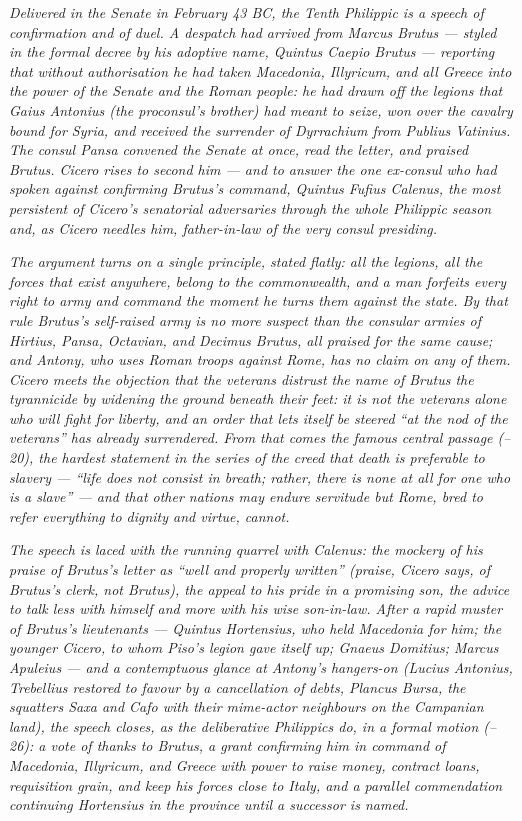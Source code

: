
\textit{Delivered in the Senate in February 43 BC, the Tenth
Philippic is a speech of confirmation and of duel. A despatch had
arrived from Marcus Brutus --- styled in the formal decree by his
adoptive name, Quintus Caepio Brutus --- reporting that without
authorisation he had taken Macedonia, Illyricum, and all Greece
into the power of the Senate and the Roman people: he had drawn off
the legions that Gaius Antonius (the proconsul's brother) had meant
to seize, won over the cavalry bound for Syria, and received the
surrender of Dyrrachium from Publius Vatinius. The consul Pansa
convened the Senate at once, read the letter, and praised Brutus.
Cicero rises to second him --- and to answer the one ex-consul who
had spoken against confirming Brutus's command, Quintus Fufius
Calenus, the most persistent of Cicero's senatorial adversaries
through the whole Philippic season and, as Cicero needles him,
father-in-law of the very consul presiding.}

\textit{The argument turns on a single principle, stated flatly:
all the legions, all the forces that exist anywhere, belong to the
commonwealth, and a man forfeits every right to army and command
the moment he turns them against the state. By that rule Brutus's
self-raised army is no more suspect than the consular armies of
Hirtius, Pansa, Octavian, and Decimus Brutus, all praised for the
same cause; and Antony, who uses Roman troops against Rome, has no
claim on any of them. Cicero meets the objection that the veterans
distrust the name of Brutus the tyrannicide by widening the ground
beneath their feet: it is not the veterans alone who will fight for
liberty, and an order that lets itself be steered ``at the nod of
the veterans'' has already surrendered. From that comes the famous
central passage (--20), the hardest statement in the
series of the creed that death is preferable to slavery --- ``life
does not consist in breath; rather, there is none at all for one
who is a slave'' --- and that other nations may endure servitude
but Rome, bred to refer everything to dignity and virtue, cannot.}

\textit{The speech is laced with the running quarrel with Calenus:
the mockery of his praise of Brutus's letter as ``well and properly
written'' (praise, Cicero says, of Brutus's clerk, not Brutus), the
appeal to his pride in a promising son, the advice to talk less
with himself and more with his wise son-in-law. After a rapid
muster of Brutus's lieutenants --- Quintus Hortensius, who held
Macedonia for him; the younger Cicero, to whom Piso's legion gave
itself up; Gnaeus Domitius; Marcus Apuleius --- and a contemptuous
glance at Antony's hangers-on (Lucius Antonius, Trebellius restored
to favour by a cancellation of debts, Plancus Bursa, the squatters
Saxa and Cafo with their mime-actor neighbours on the Campanian
land), the speech closes, as the deliberative Philippics do, in a
formal motion (--26): a vote of thanks to Brutus, a
grant confirming him in command of Macedonia, Illyricum, and Greece
with power to raise money, contract loans, requisition grain, and
keep his forces close to Italy, and a parallel commendation
continuing Hortensius in the province until a successor is named.}
